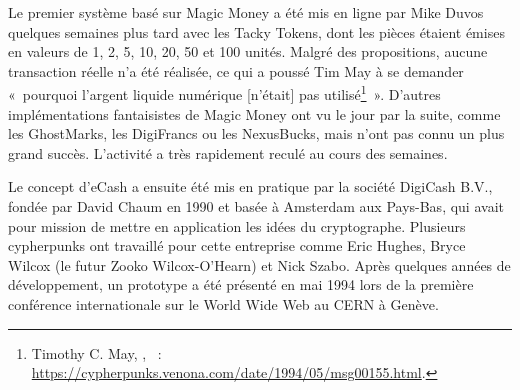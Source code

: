 Le premier système basé sur Magic Money a été mis en ligne par Mike Duvos quelques semaines plus tard avec les Tacky Tokens, dont les pièces étaient émises en valeurs de 1, 2, 5, 10, 20, 50 et 100 unités. Malgré des propositions, aucune transaction réelle n'a été réalisée, ce qui a poussé Tim May à se demander «~pourquoi l'argent liquide numérique [n'était] pas utilisé\footnote{Timothy C. May, , ~: \url{https://cypherpunks.venona.com/date/1994/05/msg00155.html}.}~». D'autres implémentations fantaisistes de Magic Money ont vu le jour par la suite, comme les GhostMarks, les DigiFrancs ou les NexusBucks, mais n'ont pas connu un plus grand succès. L'activité a très rapidement reculé au cours des semaines. %

Le concept d'eCash a ensuite été mis en pratique par la société DigiCash B.V., fondée par David Chaum en 1990 et basée à Amsterdam aux Pays-Bas, qui avait pour mission de mettre en application les idées du cryptographe. Plusieurs cypherpunks ont travaillé pour cette entreprise comme Eric Hughes, Bryce Wilcox (le futur Zooko Wilcox-O'Hearn) et Nick Szabo. Après quelques années de développement, un prototype a été présenté en mai 1994 lors de la première conférence internationale sur le World Wide Web au CERN à Genève.


